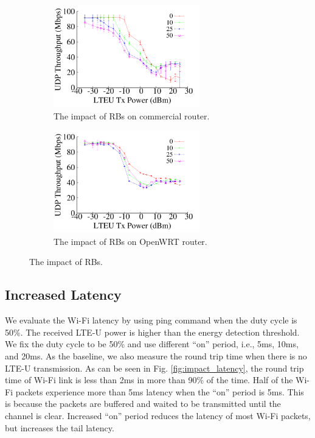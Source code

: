 \begin{figure}[t] \centering
    \begin{subfigure}[b]{\linewidth} \centering
     \includegraphics[width=2.5in, angle=0]{./figures/impact_nrbs_tplink} 
         \vspace{-0.0cm}
         \caption{The impact of RBs on commercial router.}         
        \label{impact_nrbs:a}
    \end{subfigure} %

    \begin{subfigure}[b]{\linewidth} \centering 
     \includegraphics[width=2.5in, angle=0]{./figures/impact_nrbs_openwrt}  
        \vspace{-0.0cm}
        \caption{The impact of RBs on OpenWRT router.}
        \label{impact_nrbs:b}    
    \end{subfigure} 
\caption{The impact of RBs.}
\label{impact_nrbs}
\vspace{-0.2cm}
\end{figure}





\subsection{Increased Latency}

We evaluate the Wi-Fi latency by using ping command
when the duty cycle is 50\%. 
The received LTE-U power is higher than the 
energy detection threshold. 
We fix the duty cycle to be 50\% and use different
``on'' period, i.e., 5ms, 10ms, and 20ms.
As the baseline, we also measure the round trip time
when there is no LTE-U transmission.  
As can be seen in Fig. \ref{fig:impact_latency},
the round trip time of Wi-Fi link is less
than 2ms in more than 90\% of the time.  
Half of the Wi-Fi packets experience 
more than 5ms latency when the
``on'' period is 5ms.
This is because the packets are buffered and
waited to be transmitted until the channel is
clear. 
Increased ``on'' period reduces the latency
of most Wi-Fi packets, but increases
the tail latency.  

